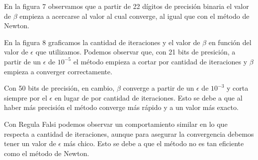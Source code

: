 En la figura 7 observamos que a partir de 22 d\'igitos de precisi\'on binaria el valor de $\beta$ empieza
a acercarse al valor al cual converge, al igual que con el m\'etodo de Newton.

En la figura 8 graficamos la cantidad de iteraciones y el valor de $\beta$ en funci\'on del valor de $\epsilon$
que utilizamos. Podemos observar que, con 21 bits de presici\'on, a partir de un $\epsilon$ de $10^{-5}$ el m\'etodo
empieza a cortar por cantidad de iteraciones y $\beta$ empieza a converger correctamente.

Con 50 bits de precisi\'on, en cambio, $\beta$ converge a partir de un $\epsilon$ de $10^{-3}$ y corta siempre por 
el $\epsilon$ en lugar de por cantidad de iteraciones. Esto se debe a que al haber m\'as precisi\'on el m\'etodo converge m\'as
r\'apido y a un valor m\'as exacto.

Con Regula Falsi podemos observar un comportamiento similar en lo que respecta a cantidad de iteraciones, aunque para asegurar
la convergencia debemos tener un valor de $\epsilon$ m\'as chico. Esto se debe a que el m\'etodo no es tan eficiente como el
m\'etodo de Newton.